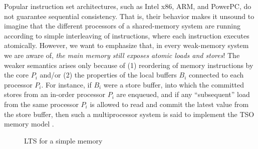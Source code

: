 %
%

Popular instruction set architectures, such as Intel x86, ARM, and PowerPC, do not guarantee sequential consistency.  That is, their behavior makes it unsound to imagine that
the different processors of a shared-memory system are running
according to simple interleaving of instructions, where each instruction executes atomically.  However, we want to emphasize that, in every weak-memory system we are aware of, \emph{the main memory still exposes atomic loads and stores}!  The weaker semantics arises only because of (1)
reordering of memory instructions by the core $P_i$ and/or (2) the
properties of the local buffers $B_i$ connected to each processor
$P_i$.  For instance, if $B_i$ were a store buffer, into which the
committed stores from an in-order processor $P_i$ are enqueued, and if
any ``subsequent'' load from the same processor $P_i$ is allowed to read and commit the latest value from the store buffer, then such a multiprocessor system is said to implement the TSO memory model \cite{x86tsocacm10}.

\begin{figure}
\small
\centering
\begin{boxedminipage}[c]{.48\textwidth}
\inference
[Ins]
{}
{}

{}

{}

{}%

\end{boxedminipage}
\caption{LTS for a simple memory}
\label{$M_m$}
\end{figure}

